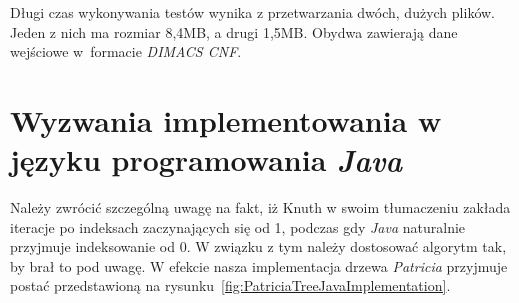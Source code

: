     Długi czas wykonywania testów wynika z przetwarzania dwóch, dużych plików. Jeden z nich ma rozmiar 8,4MB, a drugi 1,5MB. Obydwa zawierają dane wejściowe w~formacie \emph{DIMACS CNF}. 
	
	\section{Wyzwania implementowania w języku programowania \emph{Java}}\label{sec:AlgorytmPRozszerzenieTworzenieWstawienieDodawanieUwagi}
		
		Należy zwrócić szczególną uwagę na fakt, iż Knuth w swoim tłumaczeniu zakłada iteracje po indeksach zaczynających się od 1, podczas gdy \emph{Java} naturalnie przyjmuje indeksowanie od 0. W związku z tym należy dostosować algorytm tak, by brał to pod uwagę. W efekcie nasza implementacja drzewa \emph{Patricia} przyjmuje postać przedstawioną na rysunku~\ref{fig:PatriciaTreeJavaImplementation}.
		
